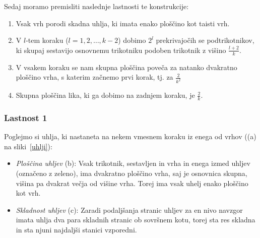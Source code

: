 \documentclass[a4paper, 12pt]{article}
\begin{document}
\noindent Sedaj moramo premisliti naslednje lastnosti te konstrukcije:

\begin{enumerate}
    \item Vsak vrh porodi skadna uhlja, ki imata enako ploščino kot taisti vrh.
    \item V $ l $-tem koraku ($ l = 1, 2, \ldots, k-2 $) dobimo $ 2^l $ prekrivajočih se podtrikotnikov, ki skupaj sestavijo osnovnemu trikotniku podoben trikotnik z višino $ \frac{l+2}{k} $.
    \item V vsakem koraku se nam skupna ploščina poveča za natanko dvakratno ploščino vrha, s katerim začnemo prvi korak, tj. za $ \frac{2}{k^2} $
    \item Skupna ploščina lika, ki ga dobimo na zadnjem koraku, je $ \frac{2}{k} $.
\end{enumerate}


\subsubsection*{Lastnost 1}

Poglejmo si uhlja, ki nastaneta na nekem vmesnem koraku iz enega od vrhov ((a) na sliki~\ref{uhlji}):

\begin{itemize}
    \item \emph{Ploščina uhljev} (b): Vsak trikotnik, sestavljen in vrha in enega izmed uhljev (označeno z zeleno), ima dvakratno ploščino vrha, saj je osnovnica skupna, višina pa dvakrat večja od višine vrha. Torej ima vsak uhelj enako ploščino kot vrh.
    \item \emph{Skladnost uhljev} (c): Zaradi podaljšanja stranic uhljev za en nivo navzgor imata uhlja dva para skladnih stranic ob sovršnem kotu, torej sta res skladna in sta njuni najdaljši stanici vzporedni.
\end{itemize}
\end{document}
